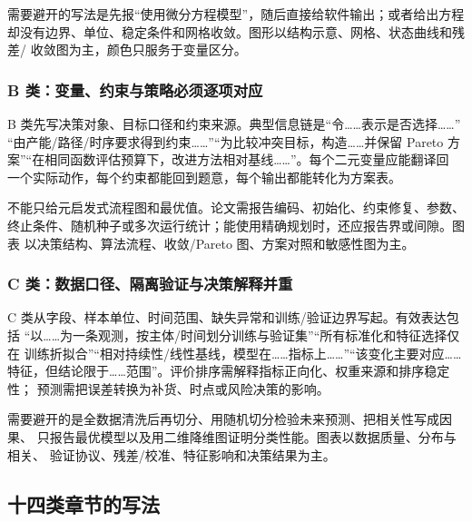 \documentclass[UTF8,a4paper,12pt]{ctexart}
\begin{document}
需要避开的写法是先报“使用微分方程模型”，随后直接给软件输出；或者给出方程
却没有边界、单位、稳定条件和网格收敛。图形以结构示意、网格、状态曲线和残差/
收敛图为主，颜色只服务于变量区分。

\subsubsection{B 类：变量、约束与策略必须逐项对应}

B 类先写决策对象、目标口径和约束来源。典型信息链是“令……表示是否选择……”
“由产能/路径/时序要求得到约束……”“为比较冲突目标，构造……并保留 Pareto
方案”“在相同函数评估预算下，改进方法相对基线……”。每个二元变量应能翻译回
一个实际动作，每个约束都能回到题意，每个输出都能转化为方案表。

不能只给元启发式流程图和最优值。论文需报告编码、初始化、约束修复、参数、
终止条件、随机种子或多次运行统计；能使用精确规划时，还应报告界或间隙。图表
以决策结构、算法流程、收敛/Pareto 图、方案对照和敏感性图为主。

\subsubsection{C 类：数据口径、隔离验证与决策解释并重}

C 类从字段、样本单位、时间范围、缺失异常和训练/验证边界写起。有效表达包括
“以……为一条观测，按主体/时间划分训练与验证集”“所有标准化和特征选择仅在
训练折拟合”“相对持续性/线性基线，模型在……指标上……”“该变化主要对应……
特征，但结论限于……范围”。评价排序需解释指标正向化、权重来源和排序稳定性；
预测需把误差转换为补货、时点或风险决策的影响。

需要避开的是全数据清洗后再切分、用随机切分检验未来预测、把相关性写成因果、
只报告最优模型以及用二维降维图证明分类性能。图表以数据质量、分布与相关、
验证协议、残差/校准、特征影响和决策结果为主。

\subsection{十四类章节的写法}
\end{document}
